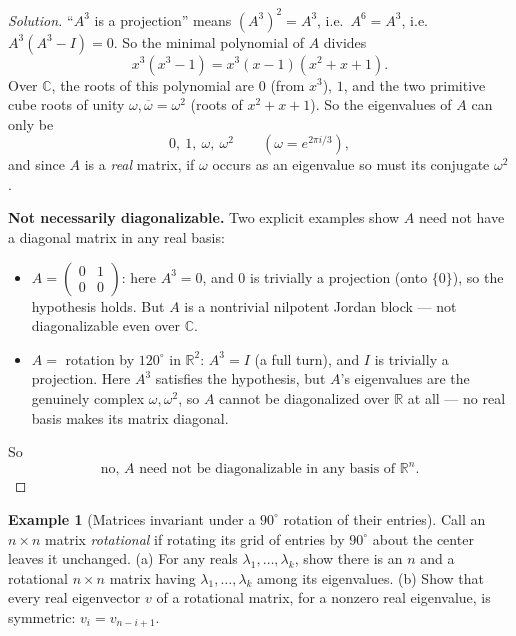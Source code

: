 \documentclass[11pt]{article}
\theoremstyle{definition}
\newtheorem{example}{Example}[section]
\newcommand{\R}{\mathbb{R}}
\newcommand{\C}{\mathbb{C}}
\begin{document}
\begin{proof}[Solution]
``$A^3$ is a projection'' means $(A^3)^2=A^3$, i.e.\ $A^6=A^3$, i.e.\ $A^3(A^3-I)=0$. So the minimal polynomial of $A$ divides
\[
x^3(x^3-1)=x^3(x-1)(x^2+x+1).
\]
Over $\C$, the roots of this polynomial are $0$ (from $x^3$), $1$, and the two primitive cube roots of unity $\omega,\overline\omega=\omega^2$ (roots of $x^2+x+1$). So the eigenvalues of $A$ can only be
\[
\boxed{0,\ 1,\ \omega,\ \omega^2} \qquad \left(\omega=e^{2\pi i/3}\right),
\]
and since $A$ is a \emph{real} matrix, if $\omega$ occurs as an eigenvalue so must its conjugate $\omega^2$.

\textbf{Not necessarily diagonalizable.} Two explicit examples show $A$ need not have a diagonal matrix in any real basis:
\begin{itemize}
\item $A=\begin{pmatrix}0&1\\0&0\end{pmatrix}$: here $A^3=0$, and $0$ is trivially a projection (onto $\{0\}$), so the hypothesis holds. But $A$ is a nontrivial nilpotent Jordan block — not diagonalizable even over $\C$.
\item $A=$ rotation by $120^\circ$ in $\R^2$: $A^3=I$ (a full turn), and $I$ is trivially a projection. Here $A^3$ satisfies the hypothesis, but $A$'s eigenvalues are the genuinely complex $\omega,\omega^2$, so $A$ cannot be diagonalized over $\R$ at all — no real basis makes its matrix diagonal.
\end{itemize}
So
\[
\boxed{\text{no, } A \text{ need not be diagonalizable in any basis of } \R^n}.
\]
\end{proof}

\begin{example}[Matrices invariant under a $90^\circ$ rotation of their entries]
Call an $n\times n$ matrix \emph{rotational} if rotating its grid of entries by $90^\circ$ about the center leaves it unchanged. (a) For any reals $\lambda_1,\dots,\lambda_k$, show there is an $n$ and a rotational $n\times n$ matrix having $\lambda_1,\dots,\lambda_k$ among its eigenvalues. (b) Show that every real eigenvector $v$ of a rotational matrix, for a nonzero real eigenvalue, is symmetric: $v_i=v_{n-i+1}$.
\end{example}
\end{document}
